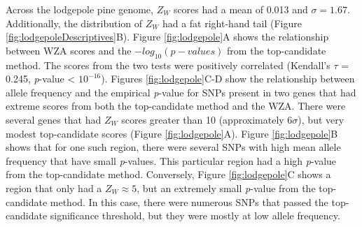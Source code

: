 \documentclass[10pt,twoside,lineno, twocolumn]{GSA_format}
\begin{document}
Across the lodgepole pine genome, $Z_W$ scores had a mean of 0.013 and $\sigma = 1.67$. Additionally, the distribution of $Z_W$ had a fat right-hand tail (Figure \ref{fig:lodgepoleDescriptives}B). Figure \ref{fig:lodgepole}A shows the relationship between WZA scores and the $-log_{10}(p-values)$ from the top-candidate method. The scores from the two tests were positively correlated (Kendall's $\tau$ = 0.245, \textit{p}-value < $10^{-16}$). Figures \ref{fig:lodgepole}C-D show the relationship between allele frequency and the empirical \textit{p}-value for SNPs present in two genes that had extreme scores from both the top-candidate method and the WZA. There were several genes that had $Z_W$ scores greater than 10 (approximately $6\sigma$), but very modest top-candidate scores (Figure \ref{fig:lodgepole}A). Figure \ref{fig:lodgepole}B shows that for one such region, there were several SNPs with high mean allele frequency that have small \textit{p}-values. This particular region had a high \textit{p}-value from the top-candidate method. Conversely, Figure \ref{fig:lodgepole}C shows a region that only had a $Z_W\approx5$, but an extremely small \textit{p}-value from the top-candidate method. In this case, there were numerous SNPs that passed the top-candidate significance threshold, but they were mostly at low allele frequency.
\end{document}
